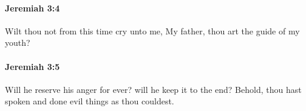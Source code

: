 		\paragraph{Jeremiah 3:4} %
			\label{JEREMIAH-3-4}

			Wilt thou not from this time cry unto me, My father, thou art the guide of my youth?


		\paragraph{Jeremiah 3:5} %
			\label{JEREMIAH-3-5}

			Will he reserve his anger for ever? will he keep it to the end? Behold, thou hast spoken and done evil things as thou couldest.


